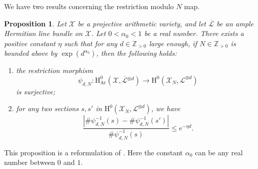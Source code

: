 \documentclass[11pt]{article}
\numberwithin{equation}{section}
\newenvironment{enumeratei}
{\bgroup\def\theenumi{\roman{enumi}}\def\theenumii{\arabic{enumii}}\begin{enumerate}}
{\end{enumerate}\egroup}
\theoremstyle{plain}
\newtheorem{prop}[thm]{Proposition}
\theoremstyle{definition}
\newcommand{\ho}{\mathrm{H}}
\newcommand{\X}{\mathcal{X}}
\newcommand{\Li}{\overline{\mathcal{L}}{}}
\newcommand{\li}{\mathcal{L}}
\newcommand{\Z}{\mathbb{Z}}
\begin{document}
We have two results concerning the restriction modulo $N$ map.
\begin{prop}\label{modN}
Let $\X$ be a projective arithmetic variety, and let $\Li$ be an ample Hermitian line bundle on $\X$. Let $0<\alpha_0<1$ be a real number. There exists a positive constant $\eta$ such that for any $d\in\Z_{>0}$ large enough, if $N\in \Z_{>0}$ is bounded above by $\exp(d^{\alpha_0})$, then the following holds:
\begin{enumeratei}
\item the restriction morphism
\[
\psi_{d,N}: \ho^0_{\mathrm{Ar}}(\X,\Li^{\otimes d}) \to \ho^0(\X_N,\li^{\otimes d})
\]
is surjective;
\item for any two sections $s,s'$ in $ \ho^0(\X_N,\li^{\otimes d})$, we have
\[
\frac{| \#\psi_{d,N}^{-1}(s)- \#\psi_{d,N}^{-1}(s') |}{\#\psi_{d,N}^{-1}(s)}\leq e^{-\eta d}.
\]
\end{enumeratei}
\end{prop}
This proposition is a reformulation of \cite[Prop.\,2.15]{Ch17}. Here the constant $\alpha_0$ can be any real number between $0$ and $1$.
\end{document}
